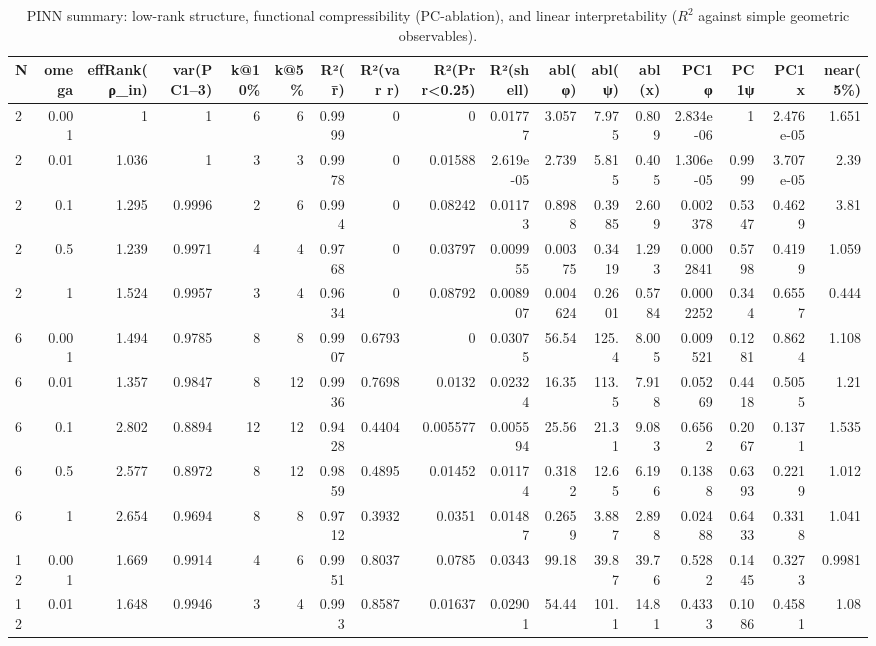 \begin{table}
\caption{PINN summary: low-rank structure, functional compressibility (PC-ablation), and linear interpretability ($R^2$ against simple geometric observables).}
\label{tab:ctnn_pinn_summary}
\begin{tabular}{lrrrrrrrrrrrrrrrr}
\toprule
N & omega & effRank(ρ\_in) & var(PC1–3) & k@10\% & k@5\% & R²(r̄) & R²(var r) & R²(Pr r<0.25) & R²(shell) & abl(φ) & abl(ψ) & abl(x) & PC1φ & PC1ψ & PC1x & near(5\%) \\
\midrule
2 & 0.001 & 1 & 1 & 6 & 6 & 0.9999 & 0 & 0 & 0.01777 & 3.057 & 7.975 & 0.809 & 2.834e-06 & 1 & 2.476e-05 & 1.651 \\
2 & 0.01 & 1.036 & 1 & 3 & 3 & 0.9978 & 0 & 0.01588 & 2.619e-05 & 2.739 & 5.815 & 0.405 & 1.306e-05 & 0.9999 & 3.707e-05 & 2.39 \\
2 & 0.1 & 1.295 & 0.9996 & 2 & 6 & 0.994 & 0 & 0.08242 & 0.01173 & 0.8988 & 0.3985 & 2.609 & 0.002378 & 0.5347 & 0.4629 & 3.81 \\
2 & 0.5 & 1.239 & 0.9971 & 4 & 4 & 0.9768 & 0 & 0.03797 & 0.009955 & 0.00375 & 0.3419 & 1.293 & 0.0002841 & 0.5798 & 0.4199 & 1.059 \\
2 & 1 & 1.524 & 0.9957 & 3 & 4 & 0.9634 & 0 & 0.08792 & 0.008907 & 0.004624 & 0.2601 & 0.5784 & 0.0002252 & 0.344 & 0.6557 & 0.444 \\
6 & 0.001 & 1.494 & 0.9785 & 8 & 8 & 0.9907 & 0.6793 & 0 & 0.03075 & 56.54 & 125.4 & 8.005 & 0.009521 & 0.1281 & 0.8624 & 1.108 \\
6 & 0.01 & 1.357 & 0.9847 & 8 & 12 & 0.9936 & 0.7698 & 0.0132 & 0.02324 & 16.35 & 113.5 & 7.918 & 0.05269 & 0.4418 & 0.5055 & 1.21 \\
6 & 0.1 & 2.802 & 0.8894 & 12 & 12 & 0.9428 & 0.4404 & 0.005577 & 0.005594 & 25.56 & 21.31 & 9.083 & 0.6562 & 0.2067 & 0.1371 & 1.535 \\
6 & 0.5 & 2.577 & 0.8972 & 8 & 12 & 0.9859 & 0.4895 & 0.01452 & 0.01174 & 0.3182 & 12.65 & 6.196 & 0.1388 & 0.6393 & 0.2219 & 1.012 \\
6 & 1 & 2.654 & 0.9694 & 8 & 8 & 0.9712 & 0.3932 & 0.0351 & 0.01487 & 0.2659 & 3.887 & 2.898 & 0.02488 & 0.6433 & 0.3318 & 1.041 \\
12 & 0.001 & 1.669 & 0.9914 & 4 & 6 & 0.9951 & 0.8037 & 0.0785 & 0.0343 & 99.18 & 39.87 & 39.76 & 0.5282 & 0.1445 & 0.3273 & 0.9981 \\
12 & 0.01 & 1.648 & 0.9946 & 3 & 4 & 0.993 & 0.8587 & 0.01637 & 0.02901 & 54.44 & 101.1 & 14.81 & 0.4333 & 0.1086 & 0.4581 & 1.08 \\

\end{tabular}
\end{table}
